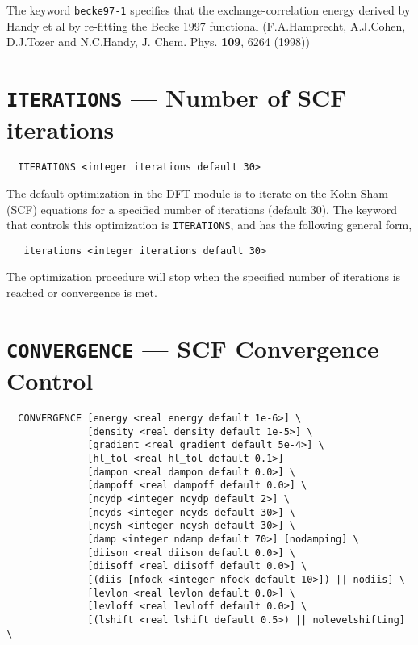 The keyword \verb+becke97-1+ specifies that the exchange-correlation energy
derived by Handy et al by re-fitting the Becke 1997 functional
(F.A.Hamprecht, A.J.Cohen, D.J.Tozer and N.C.Handy, 
    J. Chem. Phys. {\bf 109}, 6264 (1998))



\section{{\tt ITERATIONS} --- Number of SCF iterations}

\begin{verbatim}
  ITERATIONS <integer iterations default 30>
\end{verbatim}

The default optimization in the DFT module is to iterate on the 
Kohn-Sham (SCF) equations for a specified number of iterations
(default 30).  The keyword that controls this optimization 
is \verb+ITERATIONS+, and has the following general form,

\begin{verbatim}
   iterations <integer iterations default 30>
\end{verbatim}

The optimization procedure will stop when the specified number of
iterations is reached or convergence is met.

\section{{\tt CONVERGENCE} --- SCF Convergence Control}

\begin{verbatim}
  CONVERGENCE [energy <real energy default 1e-6>] \
              [density <real density default 1e-5>] \
              [gradient <real gradient default 5e-4>] \
              [hl_tol <real hl_tol default 0.1>]
              [dampon <real dampon default 0.0>] \
              [dampoff <real dampoff default 0.0>] \
              [ncydp <integer ncydp default 2>] \
              [ncyds <integer ncyds default 30>] \
              [ncysh <integer ncysh default 30>] \
              [damp <integer ndamp default 70>] [nodamping] \
              [diison <real diison default 0.0>] \
              [diisoff <real diisoff default 0.0>] \
              [(diis [nfock <integer nfock default 10>]) || nodiis] \
              [levlon <real levlon default 0.0>] \
              [levloff <real levloff default 0.0>] \
              [(lshift <real lshift default 0.5>) || nolevelshifting] \
\end{verbatim}

